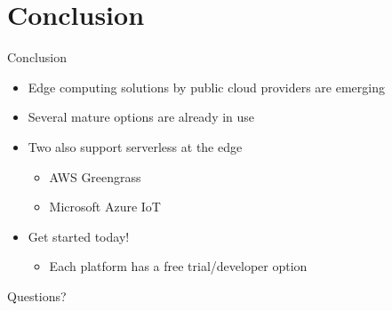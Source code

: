 \documentclass[10pt,xcolor={dvipsnames}]{beamer}
\renewcommand{\logofile}{example-grid-100x100pt}
\renewcommand{\logoscale}{0.0}
\begin{document}



\section{Conclusion}
\renewcommand{\logoscale}{0}
\begin{frame}{Conclusion}
  \begin{itemize}
      \item Edge computing solutions by public cloud providers are emerging
      \item Several mature options are already in use
      \item Two also support serverless at the edge
      \begin{itemize}
          \item AWS Greengrass
          \item Microsoft Azure IoT
      \end{itemize}
      \item Get started today!
      \begin{itemize}
          \item Each platform has a free trial/developer option
      \end{itemize}
  \end{itemize}
  
  \pause
  
  \Huge Questions?
  
\end{frame}
\end{document}
